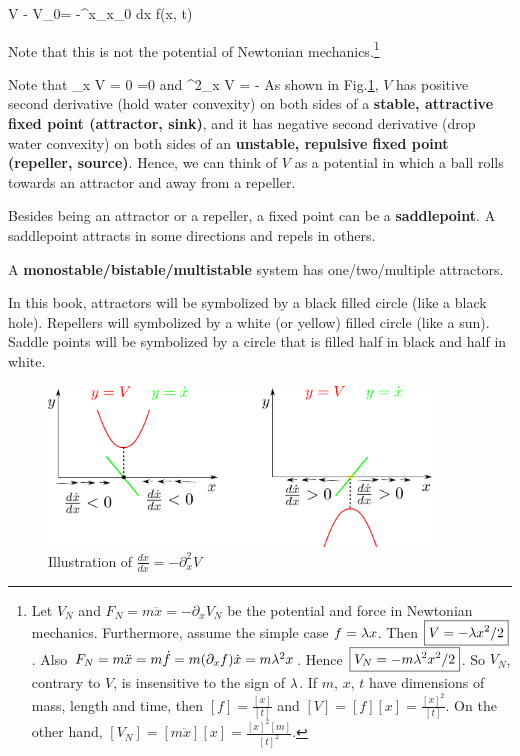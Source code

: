 \beq
V - V_0= -\int^x_{x_0} dx \; f(x, t)
\eeq

Note that this is not the potential of Newtonian mechanics.\footnote{Let $V_N$ and $F_N=m\ddot{x}=-\partial_x V_N$ be the potential and force in
Newtonian mechanics. Furthermore,
assume the simple case $f=\lambda x$. Then $\boxed{V=-\lambda x^2/2}$. Also
$F_N=m \ddot{x} =m\dot{f}=
m(\partial_x f )\dot{x}=
m\lambda^2 x$. Hence $\boxed{V_N = -m\lambda^2 x^2/2}$.
So $V_N$,
contrary to $V$, is insensitive to the sign of $\lambda$. If $m$, $x$, $t$ have
dimensions of mass, length and time, then
$[f]=\frac{[x]}{[t]}$ and $[V]=[f][x]=\frac{[x]^2}{[t]}$.
On the other hand, $[V_N]=[m\ddot{x}][x]=
\frac{[x]^2[m]}{[t]^2}$.
}



Note that
\beq
\partial_x V = 0 \iff {}=0
\eeq
and
\beq
\partial^2_x V = -
\eeq
As shown in Fig.\ref{fig-V-derivatives},
$V$ has positive second derivative
(hold water convexity)
on both sides of a {\bf stable, attractive fixed  point (attractor, sink)},
and it has negative second derivative
(drop water convexity)
on both sides of an {\bf unstable, repulsive fixed point (repeller, source)}. Hence, we can think of
$V$ as a potential in which a ball rolls towards an attractor
and away from a repeller.

Besides being an attractor or a repeller, a fixed point can be a
{\bf saddlepoint}. A saddlepoint
attracts in some directions and repels in others. 

A {\bf monostable/bistable/multistable}
system has one/two/multiple
attractors.

In this book, attractors will be symbolized by a black filled circle (like a black hole). Repellers will 
symbolized by a white (or yellow)  filled circle (like a sun).
Saddle points will be
symbolized by a circle that
is filled half in black
and half in white.


\begin{figure}[h!]
\centering
\includegraphics[width=4in]
{dynamical-sys/V-derivatives.png}
\caption{Illustration of
$\frac{d\dot{x}}{dx}=-\partial^2_xV$}
\label{fig-V-derivatives}
\end{figure}

